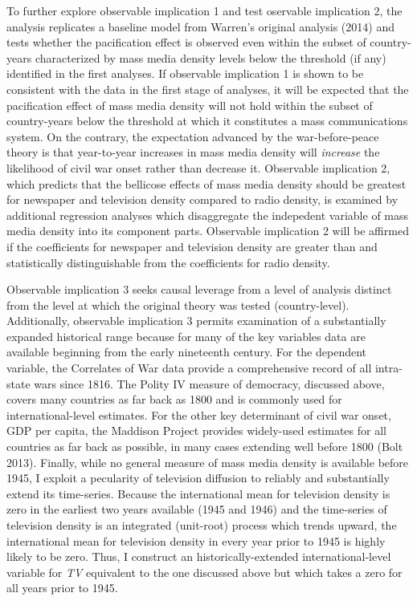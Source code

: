\documentclass[11pt,article,oneside]{memoir}
\begin{document}
To further explore observable implication 1 and test oservable
implication 2, the analysis replicates a baseline model from Warren's
original analysis (2014) and tests whether the pacification effect is
observed even within the subset of country-years characterized by mass
media density levels below the threshold (if any) identified in the
first analyses. If observable implication 1 is shown to be consistent
with the data in the first stage of analyses, it will be expected that
the pacification effect of mass media density will not hold within the
subset of country-years below the threshold at which it constitutes a
mass communications system. On the contrary, the expectation advanced by
the war-before-peace theory is that year-to-year increases in mass media
density will \emph{increase} the likelihood of civil war onset rather
than decrease it. Observable implication 2, which predicts that the
bellicose effects of mass media density should be greatest for newspaper
and television density compared to radio density, is examined by
additional regression analyses which disaggregate the indepedent
variable of mass media density into its component parts. Observable
implication 2 will be affirmed if the coefficients for newspaper and
television density are greater than and statistically distinguishable
from the coefficients for radio density.

Observable implication 3 seeks causal leverage from a level of analysis
distinct from the level at which the original theory was tested
(country-level). Additionally, observable implication 3 permits
examination of a substantially expanded historical range because for
many of the key variables data are available beginning from the early
nineteenth century. For the dependent variable, the Correlates of War
data provide a comprehensive record of all intra-state wars since 1816.
The Polity IV measure of democracy, discussed above, covers many
countries as far back as 1800 and is commonly used for
international-level estimates. For the other key determinant of civil
war onset, GDP per capita, the Maddison Project provides widely-used
estimates for all countries as far back as possible, in many cases
extending well before 1800 (Bolt 2013). Finally, while no general
measure of mass media density is available before 1945, I exploit a
pecularity of television diffusion to reliably and substantially extend
its time-series. Because the international mean for television density
is zero in the earliest two years available (1945 and 1946) and the
time-series of television density is an integrated (unit-root) process
which trends upward, the international mean for television density in
every year prior to 1945 is highly likely to be zero. Thus, I construct
an historically-extended international-level variable for \emph{TV}
equivalent to the one discussed above but which takes a zero for all
years prior to 1945.
\end{document}
